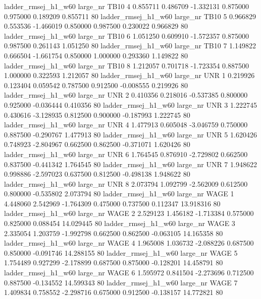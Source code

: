 ladder_rmsej_h1_w60   large_nr     TB10                 4  0.855711  0.486709  -1.332131 0.875000 0.975000  0.189209    0.855711 80
ladder_rmsej_h1_w60   large_nr     TB10                 5  0.966829  0.553536  -1.466019 0.850000 0.987500  0.230022    0.966829 80
ladder_rmsej_h1_w60   large_nr     TB10                 6  1.051250  0.609910  -1.572357 0.875000 0.987500  0.261143    1.051250 80
ladder_rmsej_h1_w60   large_nr     TB10                 7  1.149822  0.666504  -1.661754 0.850000 1.000000  0.293360    1.149822 80
ladder_rmsej_h1_w60   large_nr     TB10                 8  1.212057  0.701718  -1.723354 0.887500 1.000000  0.322593    1.212057 80
ladder_rmsej_h1_w60   large_nr      UNR                 1  0.219926  0.123404   0.059542 0.787500 0.912500 -0.008555    0.219926 80
ladder_rmsej_h1_w60   large_nr      UNR                 2  0.410356  0.218016  -0.537385 0.800000 0.925000 -0.036444    0.410356 80
ladder_rmsej_h1_w60   large_nr      UNR                 3  1.222745  0.430616  -3.128935 0.812500 0.900000 -0.187993    1.222745 80
ladder_rmsej_h1_w60   large_nr      UNR                 4  1.477913  0.605048  -3.046759 0.750000 0.887500 -0.290767    1.477913 80
ladder_rmsej_h1_w60   large_nr      UNR                 5  1.620426  0.748923  -2.804967 0.662500 0.862500 -0.371071    1.620426 80
ladder_rmsej_h1_w60   large_nr      UNR                 6  1.764545  0.876910  -2.729802 0.662500 0.837500 -0.441342    1.764545 80
ladder_rmsej_h1_w60   large_nr      UNR                 7  1.948622  0.998886  -2.597023 0.637500 0.812500 -0.498138    1.948622 80
ladder_rmsej_h1_w60   large_nr      UNR                 8  2.073794  1.092799  -2.562009 0.612500 0.800000 -0.535802    2.073794 80
ladder_rmsej_h1_w60   large_nr     WAGE                 1  4.448060  2.542969  -1.764309 0.475000 0.737500  0.112347   13.918316 80
ladder_rmsej_h1_w60   large_nr     WAGE                 2  2.529123  1.456182  -1.713384 0.575000 0.825000  0.088454   14.029445 80
ladder_rmsej_h1_w60   large_nr     WAGE                 3  2.335054  1.203759  -1.992798 0.662500 0.862500 -0.063105   14.165358 80
ladder_rmsej_h1_w60   large_nr     WAGE                 4  1.965008  1.036732  -2.088226 0.687500 0.850000 -0.091746   14.288155 80
ladder_rmsej_h1_w60   large_nr     WAGE                 5  1.754489  0.927299  -2.178899 0.687500 0.875000 -0.128201   14.458791 80
ladder_rmsej_h1_w60   large_nr     WAGE                 6  1.595972  0.841504  -2.273696 0.712500 0.887500 -0.134552   14.599343 80
ladder_rmsej_h1_w60   large_nr     WAGE                 7  1.409834  0.758552  -2.298716 0.675000 0.912500 -0.138157   14.772821 80
